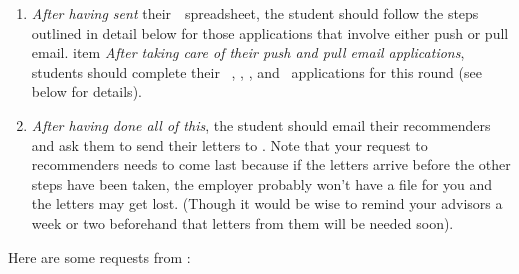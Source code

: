 \documentclass{\econtex}
\begin{document}
\begin{enumerate}
\item \textit{After having sent} their~{\EMW}~spreadsheet, the student
  should follow the steps outlined in detail below for those
  applications that involve either push or pull email.
  item \textit{After taking care of their push and pull email applications}, students should complete their {\EJM}~, \AJO, \AEA, and \Interfolio~applications for this round (see below for details).

\item \textit{After having done all of this}, the student should email their recommenders and ask them to send their letters to {\jmstaffemail}.  Note that your request to recommenders needs to come last because if the letters arrive before the other steps have been taken, the employer probably won't have a file for you and the letters may get lost.  (Though it would be wise to remind your advisors a week or two beforehand that letters from them will be needed soon).

\end{enumerate}

\hypertarget{requests-from-jmstaff}{}
Here are some requests from {\JMStaffName}:
\end{document}
